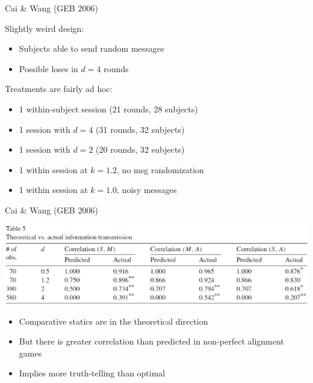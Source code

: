 \documentclass{beamer}
\begin{document}
\begin{frame}{Cai \& Wang (GEB 2006)}
	\begin{card}
Slightly weird design:
		\begin{itemize}
			\item Subjects able to send random messages
			\item Possible loses in $d=4$ rounds
		\end{itemize}
\end{card}		
\pause
\begin{card}
Treatments are fairly ad hoc:
		\begin{itemize}
			\item 1 within-subject session (21 rounds, 28 subjects)
			\item 1 session with $d=4$ (31 rounds, 32 subjects)
			\item 1 session with $d=2$ (20 rounds, 32 subjects)
			\item 1 within session at $k=1.2$, no msg randomization
			\item 1 within session at $k=1.0$, noisy messages
		\end{itemize}
	\end{card}
\end{frame}

\begin{frame}{Cai \& Wang (GEB 2006)}
\begin{card}
\begin{center}
\includegraphics[width=1\textwidth]{./i/cw2006Tbl5.eps}
\end{center}
\end{card}
\begin{card}
	\begin{itemize}
		\item Comparative statics are in the theoretical direction
		\item But there is greater correlation than predicted in non-perfect alignment games
		\item Implies more truth-telling than optimal
	\end{itemize}
\end{card}
\end{frame}
\end{document}
